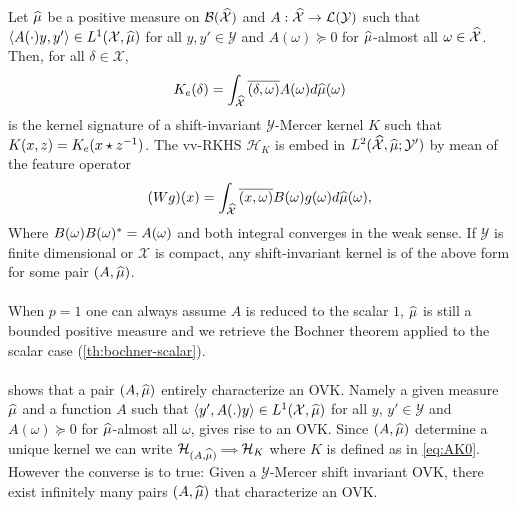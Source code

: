 \begin{proposition}
    \label{pr:mercer_kernel_bochner}
    Let $\widehat{\mu}$ be a positive measure on
    $\mathcal{B}(\mathcal{\widehat{\mathcal{X}}})$ and $A: \widehat{\mathcal{X}}\to
    \mathcal{L}(\mathcal{Y})$ such that $\langle A(\cdot)y,y'\rangle\in
    L^1(\mathcal{X},\widehat{\mu})$ for all $y,y'\in\mathcal{Y}$ and
    $A(\omega)\succcurlyeq 0$ for $\widehat{\mu}$-almost all
    $\omega\in\widehat{\mathcal{X}}$. Then, for all $\delta \in \mathcal{X}$,
    \begin{dmath}
        \label{eq:AK0}
        K_e(\delta)=\int_{\dual{\mathcal{X}}} \conj{\pairing{\delta, \omega}}
        A(\omega) d\dual{\mu}(\omega)
    \end{dmath}
    is the kernel signature of a shift-invariant $\mathcal{Y}$-Mercer kernel
    $K$ such that $K(x,z)=K_e(x \star {z}^{-1})$. The \acs{vv-RKHS}
    $\mathcal{H}_K$ is embed in
    $L^2(\widehat{\mathcal{X}},\widehat{\mu};\mathcal{Y}')$ by mean of the feature
    operator
    \begin{dmath}
        \label{eq:feature_operator}
        (Wg)(x)=\int_{\mathcal{\dual{X}}} \conj{\pairing{x,\omega}} B(\omega)
        g(\omega) d\dual{\mu}(\omega),
    \end{dmath}
    Where $B(\omega)B(\omega)^*=A(\omega)$ and both integral converges
    in the weak sense. If $\mathcal{Y}$ is finite dimensional or $\mathcal{X}$
    is compact, any shift-invariant kernel is of the above form for some pair
    $(A, \widehat{\mu})$.
\end{proposition}
\paragraph{}
When $p=1$ one can always assume $A$ is reduced to the scalar $1$, $\widehat{\mu}$
is still a bounded positive measure and we retrieve the Bochner theorem applied
to the scalar case (\cref{th:bochner-scalar}).
\paragraph{}
 shows that a pair $(A,\widehat{\mu})$ entirely
characterize an \acs{OVK}. Namely a given measure $\widehat{\mu}$ and a function
$A$ such that $\langle y', A(.)y\rangle\in L^1(\mathcal{X},\widehat{\mu})$ for all $y$,
$y'\in\mathcal{Y}$ and $A(\omega)\succcurlyeq 0$ for $\widehat{\mu}$-almost all
$\omega$, gives rise to an \acs{OVK}. Since $(A,\widehat{\mu})$ determine a unique
kernel we can write
$\mathcal{H}_{(A,\widehat{\mu})}{\scriptstyle\implies}\mathcal{H}_K$ where $K$ is
defined as in \cref{eq:AK0}. However the converse is to true: Given a
$\mathcal{Y}$-Mercer shift invariant \acl{OVK}, there exist infinitely many
pairs $(A,\widehat{\mu})$ that characterize an \acs{OVK}.
